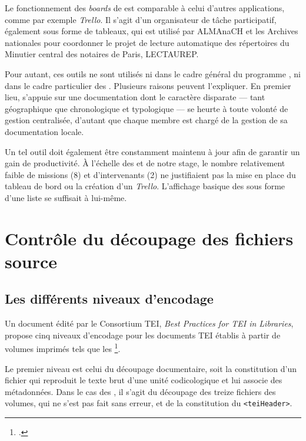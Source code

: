 Le fonctionnement des \textit{boards} de \gitlab{} est comparable à celui d'autres applications, comme par exemple \textit{Trello}. Il s'agit d'un organisateur de tâche participatif, également sous forme de tableaux, qui est utilisé par ALMAnaCH et les Archives nationales pour coordonner le projet de lecture automatique des répertoires du Minutier central des notaires de Paris, LECTAUREP.

Pour autant, ces outils ne sont utilisés ni dans le cadre général du programme \timeus, ni dans le cadre particulier des \odm. Plusieurs raisons peuvent l'expliquer. En premier lieu, \timeus{} s'appuie sur une documentation dont le caractère disparate --- tant géographique que chronologique et typologique --- se heurte à toute volonté de gestion centralisée, d'autant que chaque membre est chargé de la gestion de sa documentation locale.

Un tel outil doit également être constamment maintenu à jour afin de garantir un gain de productivité. À l'échelle des \odm{} et de notre stage, le nombre relativement faible de missions (8) et d'intervenants (2) ne justifiaient pas la mise en place du tableau de bord \gitlab{} ou la création d'un \textit{Trello}. L'affichage basique des \issues{} sous forme d'une liste se suffisait à lui-même.

\newpage
\thispagestyle{empty}
\mbox{}
\newpage

\chapter{Contrôle du découpage des fichiers source}

\section{Les différents niveaux d'encodage}

Un document édité par le Consortium TEI, \textit{Best Practices for TEI in Libraries}, propose cinq niveaux d'encodage pour les documents TEI établis à partir de volumes imprimés tels que les \lodm\footcite[\textit{4.2. Encoding Levels}]{bestpratice}.

Le premier niveau est celui du découpage documentaire, soit la constitution d'un fichier qui reproduit le texte brut d'une unité codicologique et lui associe des métadonnées. Dans le cas des \odm, il s'agit du découpage des treize fichiers des volumes, qui ne s'est pas fait sans erreur, et de la constitution du \texttt{<teiHeader>}.

